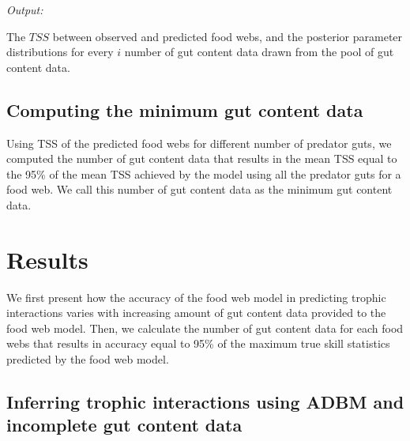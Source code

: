 \documentclass{article}
\begin{document}
\emph{Output:}

The \(TSS\) between observed and predicted food webs, and the posterior
parameter distributions for every \(i\) number of gut content data drawn
from the pool of gut content data.

\hypertarget{computing-the-minimum-gut-content-data}{%
\subsection{Computing the minimum gut content
data}\label{computing-the-minimum-gut-content-data}}

Using TSS of the predicted food webs for different number of predator
guts, we computed the number of gut content data that results in the
mean TSS equal to the 95\% of the mean TSS achieved by the model using
all the predator guts for a food web. We call this number of gut content
data as the minimum gut content data.

\hypertarget{results}{%
\section{Results}\label{results}}

We first present how the accuracy of the food web model in predicting
trophic interactions varies with increasing amount of gut content data
provided to the food web model. Then, we calculate the number of gut
content data for each food webs that results in accuracy equal to 95\%
of the maximum true skill statistics predicted by the food web model.

\hypertarget{inferring-trophic-interactions-using-adbm-and-incomplete-gut-content-data}{%
\subsection{Inferring trophic interactions using ADBM and incomplete gut
content
data}\label{inferring-trophic-interactions-using-adbm-and-incomplete-gut-content-data}}
\end{document}
